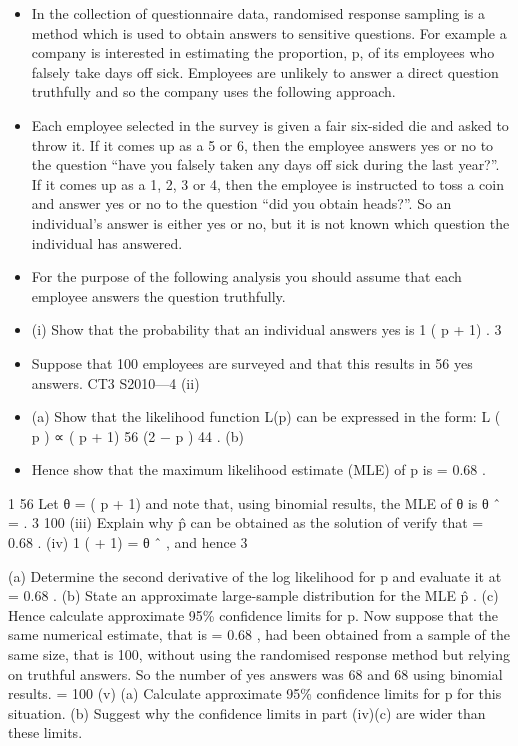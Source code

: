 \documentclass[a4paper,12pt]{article}
\begin{document}
\begin{itemize}
\item In the collection of questionnaire data, randomised response sampling is a method
which is used to obtain answers to sensitive questions. For example a company is
interested in estimating the proportion, p, of its employees who falsely take days off
sick. Employees are unlikely to answer a direct question truthfully and so the
company uses the following approach.
\item Each employee selected in the survey is given a fair six-sided die and asked to throw
it. If it comes up as a 5 or 6, then the employee answers yes or no to the question
“have you falsely taken any days off sick during the last year?”. If it comes up as a 1,
2, 3 or 4, then the employee is instructed to toss a coin and answer yes or no to the
question “did you obtain heads?”. So an individual’s answer is either yes or no, but it
is not known which question the individual has answered.
\item 
For the purpose of the following analysis you should assume that each employee
answers the question truthfully.
\item 
(i)
Show that the probability that an individual answers yes is
1
( p + 1) .
3
\item Suppose that 100 employees are surveyed and that this results in 56 yes answers.
CT3 S2010—4
(ii)
\item (a)
Show that the likelihood function L(p) can be expressed in the form:
L ( p ) ∝ ( p + 1) 56 (2 − p ) 44 .
(b)
\item Hence show that the maximum likelihood estimate (MLE) of p is
= 0.68 .

\end{itemize}

1
56
Let θ = ( p + 1) and note that, using binomial results, the MLE of θ is θ ˆ =
.
3
100
(iii)
Explain why p̂ can be obtained as the solution of
verify that = 0.68 .
(iv)
1
( + 1) = θ ˆ , and hence
3

(a) Determine the second derivative of the log likelihood for p and
evaluate it at = 0.68 .
(b) State an approximate large-sample distribution for the MLE p̂ .
(c) Hence calculate approximate 95\% confidence limits for p.
Now suppose that the same numerical estimate, that is = 0.68 , had been obtained from a sample of the same size, that is 100, without using the randomised response method but relying on truthful answers. So the number of yes answers was 68 and
68
using binomial results.
=
100
(v)
(a) Calculate approximate 95\% confidence limits for p for this situation.
(b) Suggest why the confidence limits in part (iv)(c) are wider than these
limits.
\end{document}
